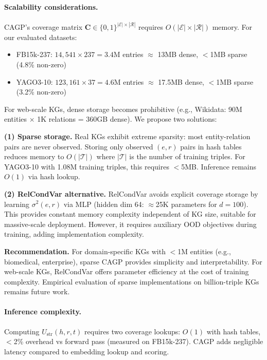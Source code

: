 
\paragraph{Scalability considerations.}
CAGP's coverage matrix $\mathbf{C} \in \{0,1\}^{|\mathcal{E}| \times |\mathcal{R}|}$ requires $O(|\mathcal{E}| \times |\mathcal{R}|)$ memory. For our evaluated datasets:

\begin{itemize}
\item FB15k-237: $14{,}541 \times 237 = 3.4$M entries $\approx$ 13MB dense, $<$1MB sparse (4.8\% non-zero)
\item YAGO3-10: $123{,}161 \times 37 = 4.6$M entries $\approx$ 17.5MB dense, $<$1MB sparse (3.2\% non-zero)
\end{itemize}

For web-scale KGs, dense storage becomes prohibitive (e.g., Wikidata: 90M entities $\times$ 1K relations = 360GB dense). We propose two solutions:

\textbf{(1) Sparse storage.} Real KGs exhibit extreme sparsity: most entity-relation pairs are never observed. Storing only observed $(e,r)$ pairs in hash tables reduces memory to $O(|\mathcal{T}|)$ where $|\mathcal{T}|$ is the number of training triples. For YAGO3-10 with 1.08M training triples, this requires $<$5MB. Inference remains $O(1)$ via hash lookup.

\textbf{(2) RelCondVar alternative.} RelCondVar avoids explicit coverage storage by learning $\sigma^2(e,r)$ via MLP (hidden dim 64: $\approx$25K parameters for $d=100$). This provides constant memory complexity independent of KG size, suitable for massive-scale deployment. However, it requires auxiliary OOD objectives during training, adding implementation complexity.

\textbf{Recommendation.} For domain-specific KGs with $<$1M entities (e.g., biomedical, enterprise), sparse CAGP provides simplicity and interpretability. For web-scale KGs, RelCondVar offers parameter efficiency at the cost of training complexity. Empirical evaluation of sparse implementations on billion-triple KGs remains future work.

\paragraph{Inference complexity.}
Computing $U_{\text{str}}(h,r,t)$ requires two coverage lookups: $O(1)$ with hash tables, $<$2\% overhead vs forward pass (measured on FB15k-237). CAGP adds negligible latency compared to embedding lookup and scoring.
